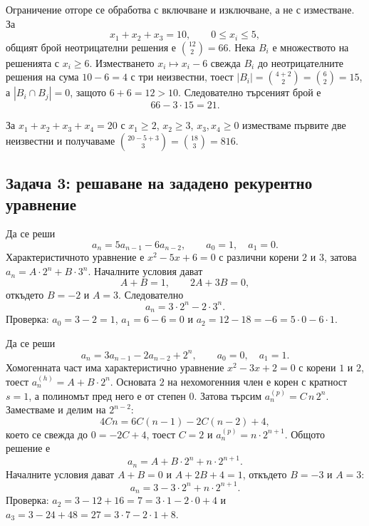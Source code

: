 \begin{example}
Ограничение отгоре се обработва с включване и изключване, а не с изместване. За
\[
x_1+x_2+x_3=10,\qquad 0\leq x_i\leq 5,
\]
общият брой неотрицателни решения е $\binom{12}{2}=66$. Нека $B_i$ е множеството
на решенията с $x_i\geq 6$. Изместването $x_i\mapsto x_i-6$ свежда $B_i$ до
неотрицателните решения на сума $10-6=4$ с три неизвестни, тоест
$|B_i|=\binom{4+2}{2}=\binom{6}{2}=15$, а $|B_i\cap B_j|=0$, защото $6+6=12>10$.
Следователно търсеният брой е
\[
66-3\cdot 15=21 .
\]
\end{example}

\begin{example}
За $x_1+x_2+x_3+x_4=20$ с $x_1\geq 2$, $x_2\geq 3$, $x_3,x_4\geq 0$ изместваме
първите две неизвестни и получаваме $\binom{20-5+3}{3}=\binom{18}{3}=816$.
\end{example}

\subsection{Задача 3: решаване на зададено рекурентно уравнение}\label{s:2.5.3}

\begin{example}
Да се реши
\[
a_n=5a_{n-1}-6a_{n-2},\qquad a_0=1,\quad a_1=0 .
\]
Характеристичното уравнение е $x^2-5x+6=0$ с различни корени $2$ и $3$, затова
$a_n=A\cdot 2^n+B\cdot 3^n$. Началните условия дават
\[
A+B=1,\qquad 2A+3B=0,
\]
откъдето $B=-2$ и $A=3$. Следователно
\[
a_n=3\cdot 2^n-2\cdot 3^n .
\]
Проверка: $a_0=3-2=1$, $a_1=6-6=0$ и $a_2=12-18=-6=5\cdot 0-6\cdot 1$.
\end{example}

\begin{example}
Да се реши
\[
a_n=3a_{n-1}-2a_{n-2}+2^n,\qquad a_0=0,\quad a_1=1 .
\]
Хомогенната част има характеристично уравнение $x^2-3x+2=0$ с корени $1$ и $2$,
тоест $a_n^{(h)}=A+B\cdot 2^n$. Основата $2$ на нехомогенния член е корен с
кратност $s=1$, а полиномът пред него е от степен $0$. Затова търсим
$a_n^{(p)}=C\,n\,2^n$. Заместваме и делим на $2^{n-2}$:
\[
4Cn=6C(n-1)-2C(n-2)+4 ,
\]
което се свежда до $0=-2C+4$, тоест $C=2$ и $a_n^{(p)}=n\cdot 2^{n+1}$. Общото
решение е
\[
a_n=A+B\cdot 2^n+n\cdot 2^{n+1}.
\]
Началните условия дават $A+B=0$ и $A+2B+4=1$, откъдето $B=-3$ и $A=3$:
\[
a_n=3-3\cdot 2^n+n\cdot 2^{n+1}.
\]
Проверка: $a_2=3-12+16=7=3\cdot 1-2\cdot 0+4$ и $a_3=3-24+48=27=3\cdot 7-2\cdot 1+8$.
\end{example}

